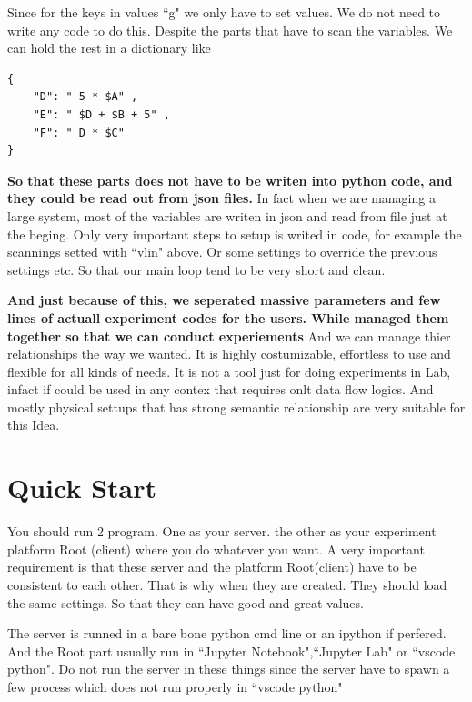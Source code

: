 \documentclass{article}
\begin{document}
Since for the keys in values ``g" we only have to set values. 
We do not need to write any code to do this.
Despite the parts that have to scan the variables.
We can hold the rest in a dictionary like 

\begin{lstlisting}
{
	"D": " 5 * $A" ,
	"E": " $D + $B + 5" ,
	"F": " D * $C" 
}
\end{lstlisting}

{\bf So that these parts does not have to be writen into python code, 
	and they could be read out from json files.}
In fact when we are managing a large system, 
	most of the variables are writen in json and read from file just at the beging.
Only very important steps to setup is writed in code, 
	for example the scannings setted with ``vlin" above.
Or some settings to override the previous settings etc.
So that our main loop tend to be very short and clean.

{\bf And just because of this, we seperated massive 
	parameters and few lines of actuall experiment codes for the users.
	While managed them together so that we can conduct experiements
}
And we can manage thier relationships the way we wanted. 
	It is highly costumizable, effortless to use and flexible for all kinds of needs.
It is not a tool just for doing experiments in Lab, 
	infact if could be used in any contex that requires onlt data flow logics.
And mostly physical settups that has strong semantic relationship are very suitable
	for this Idea.


\section{Quick Start}
You should run 2 program.
One as your server. the other as your experiment platform Root (client)
	where you do whatever you want. 
A very important requirement is that these server and the platform Root(client)
	have to be consistent to each other.
That is why when they are created. They should load the same settings.
So that they can have good and great values.

The server is runned in a bare bone python cmd line or an ipython if perfered. 
And the Root part usually run in 
	``Jupyter Notebook",``Jupyter Lab" or ``vscode python". 
Do not run the server in these things since the server have to 
	spawn a few process which does not run properly in ``vscode python"
\end{document}
